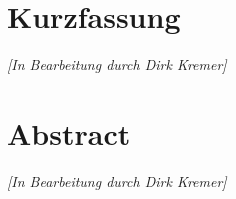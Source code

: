 
\pagestyle{empty}

\chapter*{Kurzfassung}	%
\textit{[In Bearbeitung durch Dirk Kremer]}

\newpage
\chapter*{Abstract} %
\textit{[In Bearbeitung durch Dirk Kremer]}






